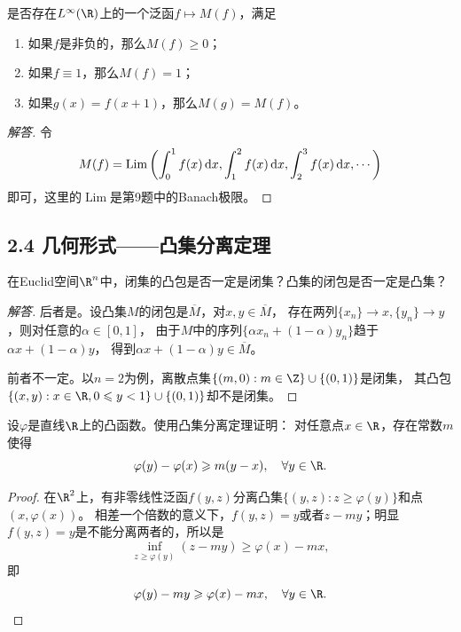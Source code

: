 \begin{13}
    是否存在$L^\infty(\R)$上的一个泛函$f \mapsto M(f)$，满足
    \begin{enumerate}
    \item[(i)] 如果$f$是非负的，那么$M(f)\geqslant0$；
    \item[(ii)] 如果$f\equiv1$，那么$M(f)=1$；
    \item[(iii)] 如果$g(x)=f(x+1)$，那么$M(g)=M(f)$。
    \end{enumerate}
\end{13}
\begin{proof}[解答]
    令
    \[M(f)=\operatorname{Lim}\left(\int_0^1f(x)\,{\rm d}x,
    \int_1^2f(x)\,{\rm d}x,\int_2^3f(x)\,{\rm d}x,\cdots\right)\]
    即可，这里的$\operatorname{Lim}$是第9题中的Banach极限。
\end{proof}

\subsection{2.4 几何形式------凸集分离定理}
\begin{1}
    在Euclid空间$\R^n$中，闭集的凸包是否一定是闭集？凸集的闭包是否一定是凸集？
\end{1}
\begin{proof}[解答]
    后者是。设凸集$M$的闭包是$\overline{M}$，对$x,y\in\overline{M}$，
    存在两列$\{x_n\}\to x,\{y_n\}\to y$，则对任意的$\alpha\in[0,1]$，
    由于$M$中的序列$\{\alpha x_n+(1-\alpha) y_n\}$趋于$\alpha x+(1-\alpha) y$，
    得到$\alpha x+(1-\alpha) y\in\overline{M}$。

    前者不一定。以$n=2$为例，离散点集$\{(m,0):m\in\Z\}\cup\{(0,1)\}$是闭集，
    其凸包$\{(x,y):x\in\R,0 \leqslant y < 1\}\cup\{(0,1)\}$却不是闭集。
\end{proof}

\begin{6}
    设$\varphi$是直线$\R$上的凸函数。使用凸集分离定理证明：
    对任意点$x\in\R$，存在常数$m$使得
    \[\varphi(y)-\varphi(x) \geqslant m(y-x),\quad\forall y\in\R.\]
\end{6}
\begin{proof}
    在$\R^2$上，有非零线性泛函$f(y,z)$分离凸集$\{(y,z):z\geqslant\varphi(y)\}$和点$(x,\varphi(x))$。
    相差一个倍数的意义下，$f(y,z)=y$或者$z-my$；明显$f(y,z)=y$是不能分离两者的，所以是
    \[\inf_{z\geqslant\varphi(y)}(z-my)\geqslant\varphi(x)-mx,\]
    即\[\varphi(y)-my\geqslant\varphi(x)-mx,\quad\forall y\in\R.\qedhere\]
\end{proof}

